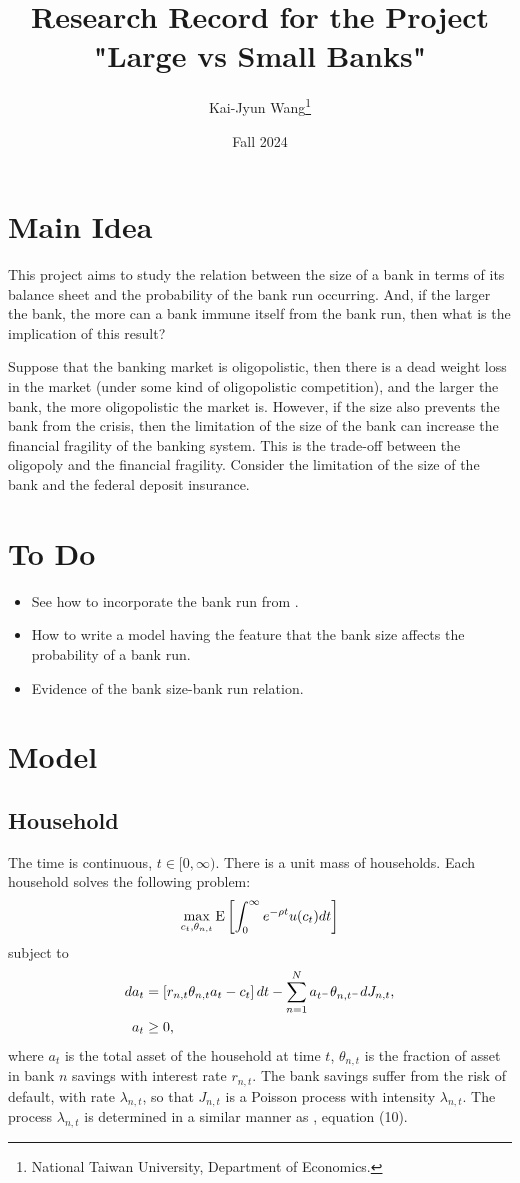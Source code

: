 \documentclass[a4paper, 12pt]{article}
\title{Research Record for the Project "Large vs Small Banks"}
\author{Kai-Jyun Wang\thanks{National Taiwan University, Department of Economics.}}
\date{Fall 2024}
\begin{document}
 
\maketitle

\section{Main Idea} 
This project aims to study the relation between the size of a 
bank in terms of its balance sheet and the probability of the 
bank run occurring. And, if the larger the bank, the more can 
a bank immune itself from the bank run, then what is the 
implication of this result? 

Suppose that the banking market is oligopolistic, then there 
is a dead weight loss in the market (under some kind of oligopolistic 
competition), and the larger the bank, the more oligopolistic the 
market is. However, if the size also prevents the bank from the 
crisis, then the limitation of the size of the bank can increase 
the financial fragility of the banking system. This is the 
trade-off between the oligopoly and the financial fragility. 
Consider the limitation of the size of the bank and the federal 
deposit insurance. 

\section{To Do}
\begin{itemize}
    \item See how to incorporate the bank run from \cite{diamond1983}.  
    \item How to write a model having the feature that the bank size affects 
    the probability of a bank run. 
    \item Evidence of the bank size-bank run relation.
\end{itemize}

\section{Model} 
\subsection{Household}
The time is continuous, $t\in[0,\infty)$. There is a unit mass of households. 
Each household solves the following problem:
\begin{equation}
    \max_{c_t, \theta_{n,t}} {\operatorname{E}}\left[ {\int_0^\infty e^{-\rho t}u(c_t)dt} \right]
\end{equation}
subject to
\begin{align}
    da_t &= \left[ {r_{n,t}\theta_{n,t}a_t - c_t} \right]dt - \sum_{n=1}^N a_{t^-}\theta_{n,t^-}dJ_{n,t}, \\
    a_t &\geq 0, 
\end{align}
where $a_t$ is the total asset of the household at time $t$, 
$\theta_{n,t}$ is the fraction of asset in bank $n$ savings with interest 
rate $r_{n,t}$. The bank savings suffer from the risk of default, 
with rate $\lambda_{n,t}$, so that $J_{n,t}$ is a Poisson process with intensity 
$\lambda_{n,t}$. The process $\lambda_{n,t}$ is determined in a similar manner 
as \cite{moreira2017}, equation (10).
\end{document}
